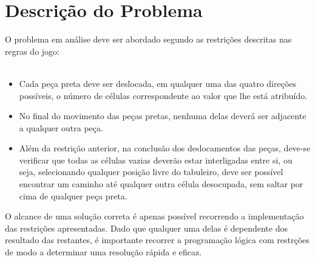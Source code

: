 \chapter{Descri\c{c}\~ao do Problema}
\label{intro} %

O problema em an\'alise deve ser abordado segundo as restri\c{c}\~oes descritas nas regras do jogo:\\
\\
\begin{itemize}
	\item Cada pe\c{c}a preta deve ser deslocada, em qualquer uma das quatro dire\c{c}\~oes poss\'iveis, o n\'umero de c\'elulas correspondente ao valor que lhe est\'a atribu\'ido.
	
	\item No final do movimento das pe\c{c}as pretas, nenhuma delas dever\'a ser adjacente a qualquer outra pe\c{c}a.
	
	\item Al\'em da restri\c{c}\~ao anterior, na conclus\~ao dos deslocamentos das pe\c{c}as, deve-se verificar que todas as c\'elulas vazias dever\~ao estar interligadas entre si, ou seja, selecionando qualquer posi\c{c}\~ao livre do tabuleiro, deve ser poss\'ivel encontrar um caminho at\'e qualquer outra c\'elula desocupada, sem saltar por cima de qualquer pe\c{c}a preta.
\end{itemize}

O alcance de uma solu\c{c}\~ao correta \'e apenas poss\'ivel recorrendo a implementa\c{c}\~ao das restri\c{c}\~oes apresentadas. Dado que qualquer uma delas \'e dependente dos resultado das restantes, \'e importante recorrer a programa\c{c}\~ao l\'ogica com restr\c{c}\~oes de modo a determinar uma resolu\c{c}\~ao r\'apida e eficaz.